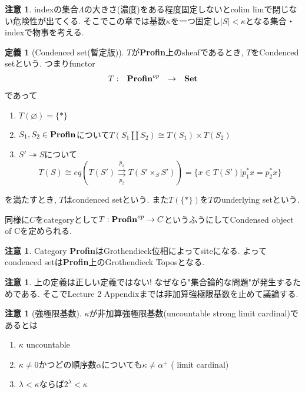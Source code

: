 \documentclass[dvipdfmx,a4paper,11pt]{report}
\theoremstyle{definition}
\newtheorem{dfn}[thm]{定義}
\newtheorem{rem}[thm]{注意}
\begin{document}
 \begin{rem}
 indexの集合$\Lambda$の大きさ(濃度)をある程度固定しないとcolim limで閉じない危険性が出てくる.
 そこでこの章では基数$\kappa$を一つ固定し$|S| < \kappa$となる集合・indexで物事を考える.
 \end{rem}
 
 \begin{tcolorbox}
 [colback = white, colframe = green!35!black, fonttitle = \bfseries,breakable = true]
\begin{dfn}[Condenced set(暫定版)] \cite[Definition 1.2]{Sch19}
$T$が{\bf Profin}上のsheafであるとき, $T$をCondenced setという. 
つまりfunctor
 $$
\begin{array}{cccc}
T : &{\bf Profin}^{op}& \rightarrow &{\bf Set}  \\
\end{array}
$$
であって
\begin{enumerate}
\item $T(\varnothing) = \{ \ast\}$
\item $S_1, S_2 \in {\bf Profin}$について$T(S_1 \coprod S_2) \cong T(S_1) \times T(S_2)$
\item $S' \twoheadrightarrow S$について
$$
T(S) \cong eq(T(S')\underset{p_2}{\overset{p_1}{\rightrightarrows}} T(S' \times_{S} S'))
=\{ x \in T(S') | p_{1}^{*}x = p_{2}^{*}x\}
$$
\end{enumerate}
を満たすとき, $T$はcondenced setという. 
また$T(\{\ast\})$を$T$のunderlying setという. 
 \end{dfn}
 \end{tcolorbox}
 同様に$C$をcategoryとして$T : {\bf Profin}^{op} \rightarrow  C$というふうにしてCondensed object of Cを定められる.
 \begin{rem}
Category {\bf Profin}はGrothendieck位相によってsiteになる.
よってcondenced setは{\bf Profin}上のGrothendieck Toposとなる.
  \end{rem}
  
 \begin{rem}\cite[Remark 1.3]{Sch19}
 上の定義は正しい定義ではない! なぜなら"集合論的な問題"が発生するためである. 
 そこでLecture 2 Appendixまでは非加算強極限基数を止めて議論する. 
 \end{rem}


 
 \begin{tcolorbox}
 [colback = white, colframe = green!35!black, fonttitle = \bfseries,breakable = true]
\begin{rem}[強極限基数]
$\kappa$が非加算強極限基数(uncountable strong limit cardinal)であるとは
\begin{enumerate}
\item $\kappa$ uncountable
\item $\kappa \neq 0$かつどの順序数$\alpha$についても$\kappa \neq \alpha^{+}$ ( limit cardinal)
\item  $\lambda < \kappa$ならば$2^{\lambda} < \kappa$
\end{enumerate}
 \end{rem}
 \end{tcolorbox}
 
\end{document}
